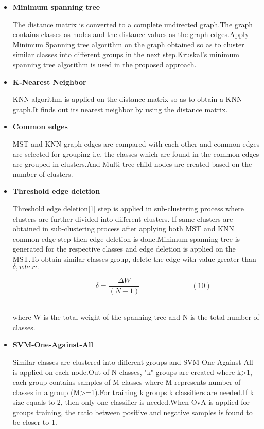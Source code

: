 \documentclass[a4paper, 10pt, conference]{ieeeconf}      %
\begin{document}
\begin{itemize}
\item\textbf{Minimum spanning tree}
\par
The distance matrix is converted to a complete undirected graph.The graph contains classes as nodes and the distance values as the graph edges.Apply Minimum Spanning tree algorithm on the graph obtained so as to cluster similar classes into different groups in the next step.Kruskal's minimum spanning tree algorithm is used in the proposed approach.  
\item\textbf{K-Nearest Neighbor}
\par
KNN algorithm is applied on the distance matrix so as to obtain a KNN graph.It finds out its nearest neighbor by using the distance matrix.
\item\textbf{Common edges}
\par
MST and KNN graph edges are compared with each other and common edges are selected for grouping i.e, the classes which are found in the common edges are grouped in clusters.And Multi-tree child nodes are created based on the number of clusters. 
\item\textbf{Threshold edge deletion}
\par
Threshold edge deletion[1] step is applied in sub-clustering process where clusters are further divided into different clusters. If same clusters are obtained in sub-clustering process after applying both MST and KNN common edge step then edge deletion is done.Minimum spanning tree is generated for the respective classes and edge deletion is applied on the MST.To obtain similar classes group, delete the edge with value greater than $\delta,where$ 
\par
\[\hspace{2cm}\delta = \frac{\Delta W}{(N-1)}\hspace{3cm}(10)\] \\

\par 
where W is the total weight of the spanning tree and N is the total number of classes.

\item\textbf{SVM-One-Against-All}
\par
Similar classes are clustered into different groups and SVM One-Against-All is applied on each node.Out of N classes, "k" groups are created where k\textgreater1, each group contains samples of M classes where M represents number of classes in a group (M\textgreater=1).For training k groups k classifiers are needed.If k size equals to 2, then only one classifier is needed.When OvA is applied for groups training, the ratio between positive and negative samples is found to be closer to 1.
\end{itemize}
\end{document}
